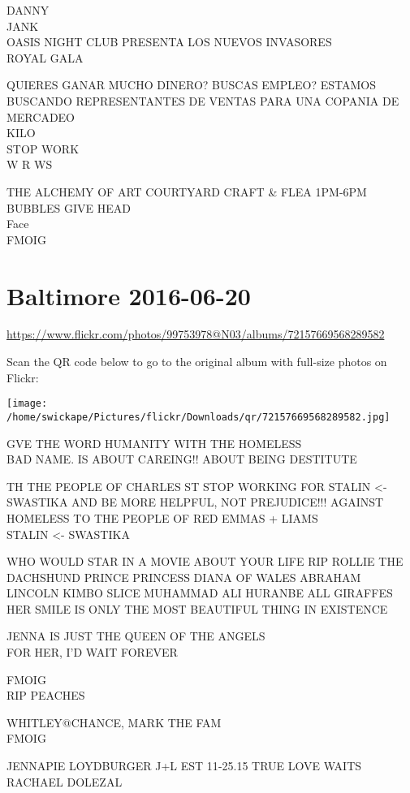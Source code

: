 \documentclass[10pt,letterpaper]{article}
\begin{document}
DANNY\\
JANK\\
OASIS NIGHT CLUB PRESENTA LOS NUEVOS INVASORES\\
ROYAL GALA

QUIERES GANAR MUCHO DINERO?  BUSCAS EMPLEO?  ESTAMOS BUSCANDO REPRESENTANTES DE VENTAS PARA UNA COPANIA DE MERCADEO\\
KILO\\
STOP WORK\\
W R WS

THE ALCHEMY OF ART COURTYARD CRAFT \& FLEA 1PM{-}6PM\\
BUBBLES GIVE HEAD\\
Face\\
FMOIG


\section*{Baltimore 2016-06-20}

\url{https://www.flickr.com/photos/99753978@N03/albums/72157669568289582}

Scan the QR code below to go to the original album with full-size photos on Flickr:

\texttt{[image: /home/swickape/Pictures/flickr/Downloads/qr/72157669568289582.jpg]}


GVE THE WORD HUMANITY WITH THE HOMELESS\\
BAD NAME.  IS ABOUT CAREING!! ABOUT BEING DESTITUTE

TH THE PEOPLE OF CHARLES ST STOP WORKING FOR STALIN <{-} SWASTIKA AND BE MORE HELPFUL, NOT PREJUDICE!!! AGAINST HOMELESS TO THE PEOPLE OF RED EMMAS + LIAMS\\
STALIN <{-} SWASTIKA

WHO WOULD STAR IN A MOVIE ABOUT YOUR LIFE RIP ROLLIE THE DACHSHUND PRINCE PRINCESS DIANA OF WALES ABRAHAM LINCOLN KIMBO SLICE MUHAMMAD ALI HURANBE ALL GIRAFFES\\
HER SMILE IS ONLY THE MOST BEAUTIFUL THING IN  EXISTENCE

JENNA IS JUST THE QUEEN OF THE ANGELS\\
FOR HER, I'D WAIT FOREVER

FMOIG\\
RIP PEACHES

WHITLEY@CHANCE, MARK THE FAM\\
FMOIG

JENNAPIE LOYDBURGER J+L EST 11{-}25.15 TRUE LOVE WAITS\\
RACHAEL DOLEZAL
\end{document}
